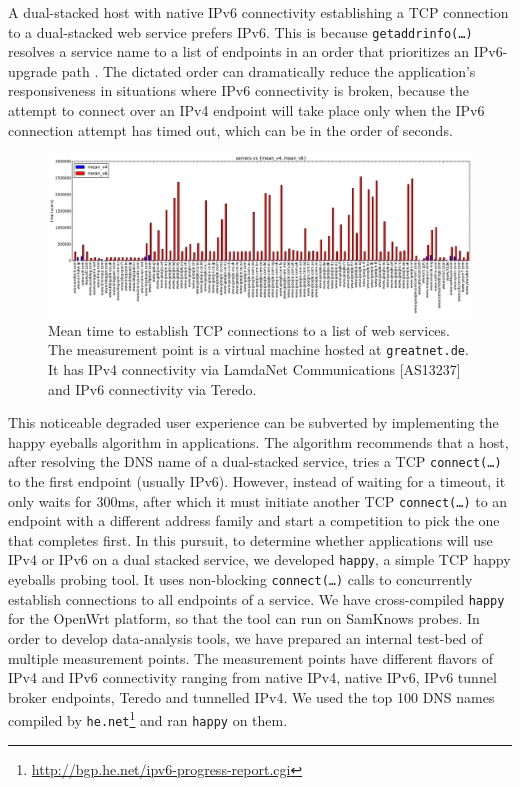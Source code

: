 A dual-stacked host with native IPv6 connectivity establishing a TCP
connection to a dual-stacked web service prefers IPv6. This is because
\texttt{getaddrinfo(\ldots)} resolves a service name to a list of endpoints in
an order that prioritizes an IPv6-upgrade path \cite{rfc6724}.  The dictated
order can dramatically reduce the application's responsiveness in situations
where IPv6 connectivity is broken, because the attempt to connect over an IPv4
endpoint will take place only when the IPv6 connection attempt has timed out,
which can be in the order of seconds.

\begin{figure}[t]
\centering
\includegraphics[width=1.0\textwidth]{figures/t28972-mean}
\caption{Mean time to establish TCP connections to a list of web services. The
measurement point is a virtual machine hosted at \texttt{greatnet.de}. It
has IPv4 connectivity via LamdaNet Communications [AS13237] and IPv6
connectivity via Teredo.}
\label{fig:t28972-mean}
\end{figure}

This noticeable degraded user experience can be subverted by implementing the
happy eyeballs algorithm \cite{rfc6555} in applications. The algorithm
recommends that a host, after resolving the DNS name of a dual-stacked
service, tries a TCP \texttt{connect(\ldots)} to the first endpoint (usually
IPv6). However, instead of waiting for a timeout, it only waits for 300ms,
after which it must initiate another TCP \texttt{connect(\ldots)} to an
endpoint with a different address family and start a competition to pick the
one that completes first.  In this pursuit, to determine whether applications
will use IPv4 or IPv6 on a dual stacked service, we developed \texttt{happy},
a simple TCP happy eyeballs probing tool. It uses non-blocking
\texttt{connect(\ldots)} calls to concurrently establish connections to all
endpoints of a service.  We have cross-compiled \texttt{happy} for the OpenWrt
platform, so that the tool can run on SamKnows probes. In order to develop
data-analysis tools, we have prepared an internal test-bed of multiple
measurement points. The measurement points have different flavors of IPv4 and
IPv6 connectivity ranging from native IPv4, native IPv6, IPv6 tunnel broker
endpoints, Teredo and tunnelled IPv4. We used the top 100 DNS names compiled
by \texttt{he.net}\footnote{\url{http://bgp.he.net/ipv6-progress-report.cgi}}
and ran \texttt{happy} on them.

